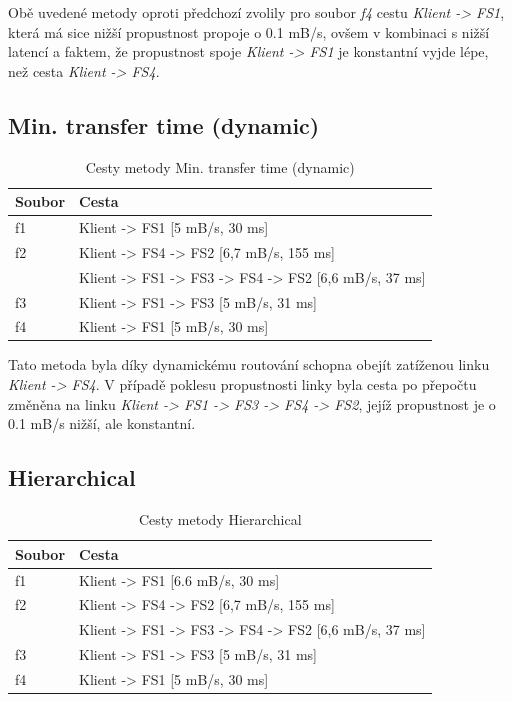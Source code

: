 \documentclass[czech,DP]{thesiskiv}
\begin{document}
Obě uvedené metody oproti předchozí zvolily pro soubor \textit{f4} cestu \textit{Klient -> FS1}, která má sice nižší propustnost propoje o 0.1 mB/s, ovšem v kombinaci s nižší latencí a faktem, že propustnost spoje \textit{Klient -> FS1} je konstantní vyjde lépe, než cesta \textit{Klient -> FS4}.

\subsection{Min. transfer time (dynamic)}

\begin{table}[H]
\centering
\caption{Cesty metody Min. transfer time (dynamic)}
\begin{tabular}{|l|l|}
\hline
\textbf{Soubor} & \textbf{Cesta}           \\ \hline
f1              & Klient -> FS1 [5 mB/s, 30 ms]\\ \hline
f2              & Klient -> FS4 -> FS2 [6,7 mB/s, 155 ms]\\ \hline
                 & Klient -> FS1 -> FS3 -> FS4 -> FS2 [6,6 mB/s, 37 ms]\\ \hline
f3              & Klient -> FS1 -> FS3 [5 mB/s, 31 ms]\\ \hline
f4              & Klient -> FS1 [5 mB/s, 30 ms]\\ \hline
\end{tabular}
\end{table}

Tato metoda byla díky dynamickému routování schopna obejít zatíženou linku \textit{Klient -> FS4}. V případě poklesu propustnosti linky byla cesta po přepočtu změněna na linku \textit{Klient -> FS1 -> FS3 -> FS4 -> FS2}, jejíž propustnost je o 0.1 mB/s nižší, ale konstantní.

\subsection{Hierarchical}

\begin{table}[H]
\centering
\caption{Cesty metody Hierarchical}
\begin{tabular}{|l|l|}
\hline
\textbf{Soubor} & \textbf{Cesta}           \\ \hline
f1              & Klient -> FS1 [6.6 mB/s, 30 ms]\\ \hline
f2              & Klient -> FS4 -> FS2 [6,7 mB/s, 155 ms]\\ \hline
                 & Klient -> FS1 -> FS3 -> FS4 -> FS2 [6,6 mB/s, 37 ms]\\ \hline
f3              & Klient -> FS1 -> FS3 [5 mB/s, 31 ms]\\ \hline
f4              & Klient -> FS1 [5 mB/s, 30 ms]\\ \hline
\end{tabular}
\end{table}
\end{document}
